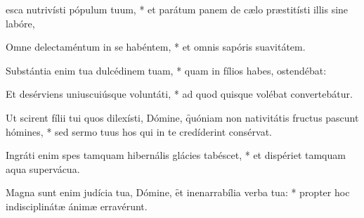 \begin{psalmus}

 esca nutrivísti pópulum tuum, * et parátum panem de cælo præstitísti illis sine labóre,

Omne delectaméntum in se habéntem, * et omnis sapóris suavitátem.

Substántia enim tua dulcédinem tuam, * quam in fílios habes, ostendébat:

Et desérviens uniuscuiúsque voluntáti, * ad quod quisque volébat convertebátur.

Ut scirent fílii tui quos dilexísti, Dómine, \f quóniam non nativitátis fructus pascunt hómines, * sed sermo tuus hos qui in te credíderint consérvat.

Ingráti enim spes tamquam hibernális glácies tabéscet, * et dispériet tamquam aqua supervácua.

Magna sunt enim judícia tua, Dómine, \f et inenarrabília verba tua: * propter hoc indisciplinátæ ánimæ erravérunt.

\end{psalmus}
